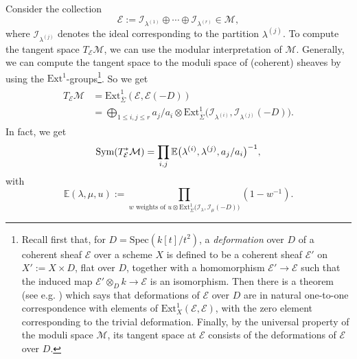 \documentclass[11pt,colorinlistoftodos]{amsart}
\numberwithin{equation}{subsection}
\theoremstyle{plain}
\theoremstyle{definition}
\theoremstyle{remark}
\newcommand{\E}{\mathbb{E}}
\newcommand{\calI}{\mathcal{I}}
\newcommand{\calM}{\mathcal{M}}
\newcommand{\calE}{\mathcal{E}}
\newcommand{\Sym}{\textnormal{Sym}}
\begin{document}
Consider the collection  
\[
\mathcal{E}:=\calI_{\lambda^{(1)}}\oplus\dotsm \oplus \calI_{\lambda^{(r)}}\in \calM,
\]
where $\calI_{\lambda^{(j)}}$ denotes the ideal corresponding to the partition $\lambda^{(j)}$.
To compute the tangent space $T_\mathcal{E}\calM$, we can use the modular interpretation of $\calM$. Generally, we can compute the tangent space to the moduli space of (coherent) sheaves by using the $\mathrm{Ext}^1$-groups\footnote{Recall first that, for $D=\mathrm{Spec}(k[t]/t^2)$, a \emph{deformation} over $D$ of a coherent sheaf $\calE$ over a scheme $X$ is defined to be a coherent sheaf $\calE'$ on $X':=X\times D$, flat over $D$, together with a homomorphism $\calE'\to\calE$ such that the induced map $\calE'\otimes_Dk\to \calE$ is an isomorphism. Then there is a theorem (see e.g. \cite{Hartshorne2010}) which says that deformations of $\calE$ over $D$ are in natural one-to-one correspondence with elements of $\mathrm{Ext}^1_X(\calE,\calE)$, with the zero element corresponding to the trivial deformation. Finally, by the universal property of the moduli space $\calM$, its tangent space at $\calE$ consists of the deformations of $\calE$ over $D$.}. So we get 
\begin{align}
\begin{split}
    T_\mathcal{E}\calM&=\mathrm{Ext}^1_{\overline{\Sigma}}(\mathcal{E},\mathcal{E}(-D))\\
    &=\bigoplus_{1\leq i,j\leq r} a_j/a_i\otimes \mathrm{Ext}^1_{\overline{\Sigma}}\big(\calI_{\lambda^{(i)}},\calI_{\lambda^{(j)}}(-D)\big).
\end{split}
\end{align}
In fact, we get 
\[
\Sym(T^*_\mathcal{E}\calM)=\prod_{i,j}\E\big(\lambda^{(i)},\lambda^{(j)},a_j/a_i\big)^{-1},
\]
with 
\begin{equation}
\label{eq:character}
\E(\lambda,\mu,u):=\prod_{\text{$w$ weights of $u\otimes \mathrm{Ext}^1_{\overline{\Sigma}}\big(\calI_\lambda,\calI_\mu(-D)\big)$}}(1-w^{-1}).
\end{equation}
\end{document}
